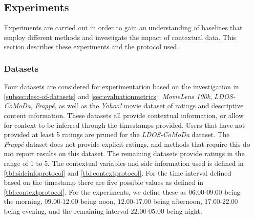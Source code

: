 \subsection{Experiments}\label{subsec:experimentprotocol}
Experiments are carried out in order to gain an understanding of baselines that employ different methods and investigate the impact of contextual data.
This section describes these experiments and the protocol used.

\subsubsection{Datasets}
Four datasets are considered for experimentation based on the investigation in \autoref{subsec:desc-of-datasets} and \autoref{sec:evaluationmetrics}: \textit{MovieLens 100k}, \textit{LDOS-CoMoDa}, \textit{Frappé}, as well as the \textit{Yahoo!} movie dataset of ratings and descriptive content information\cite{yahoo-movie}.
These datasets all provide contextual information, or allow for context to be inferred through the timestamps provided.
Users that have not provided at least 5 ratings are pruned for the \textit{LDOS-CoMoDa} dataset.
The \textit{Frappé} dataset does not provide explicit ratings, and methods that require this do not report results on this dataset.
The remaining datasets provide ratings in the range of 1 to 5.
The contextual variables and side information used is defined in \autoref{tbl:sideinfoprotocol} and \autoref{tbl:contextprotocol}.
For the time interval defined based on the timestamp there are five possible values as defined in \autoref{tbl:contextprotocol}.
For the experiments, we define these as $06.00$-$09.00$ being the morning, $09.00$-$12.00$ being noon, $12.00$-$17.00$ being afternoon, $17.00$-$22.00$ being evening, and the remaining interval $22.00$-$05.00$ being night.
\\
